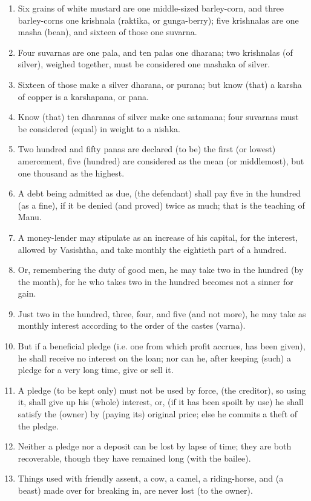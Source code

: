 \begin{enumerate}
\item Six grains of white mustard are one middle-sized barley-corn, and three barley-corns one krishnala (raktika, or gunga-berry); five krishnalas are one masha (bean), and sixteen of those one suvarna.
\item Four suvarnas are one pala, and ten palas one dharana; two krishnalas (of silver), weighed together, must be considered one mashaka of silver.
\item Sixteen of those make a silver dharana, or purana; but know (that) a karsha of copper is a karshapana, or pana.
\item Know (that) ten dharanas of silver make one satamana; four suvarnas must be considered (equal) in weight to a nishka.
\item Two hundred and fifty panas are declared (to be) the first (or lowest) amercement, five (hundred) are considered as the mean (or middlemost), but one thousand as the highest.
\item A debt being admitted as due, (the defendant) shall pay five in the hundred (as a fine), if it be denied (and proved) twice as much; that is the teaching of Manu.
\item A money-lender may stipulate as an increase of his capital, for the interest, allowed by Vasishtha, and take monthly the eightieth part of a hundred.
\item Or, remembering the duty of good men, he may take two in the hundred (by the month), for he who takes two in the hundred becomes not a sinner for gain.
\item Just two in the hundred, three, four, and five (and not more), he may take as monthly interest according to the order of the castes (varna).
\item But if a beneficial pledge (i.e. one from which profit accrues, has been given), he shall receive no interest on the loan; nor can he, after keeping (such) a pledge for a very long time, give or sell it.
\item A pledge (to be kept only) must not be used by force, (the creditor), so using it, shall give up his (whole) interest, or, (if it has been spoilt by use) he shall satisfy the (owner) by (paying its) original price; else he commits a theft of the pledge.
\item Neither a pledge nor a deposit can be lost by lapse of time; they are both recoverable, though they have remained long (with the bailee).
\item Things used with friendly assent, a cow, a camel, a riding-horse, and (a beast) made over for breaking in, are never lost (to the owner).

\end{enumerate}
